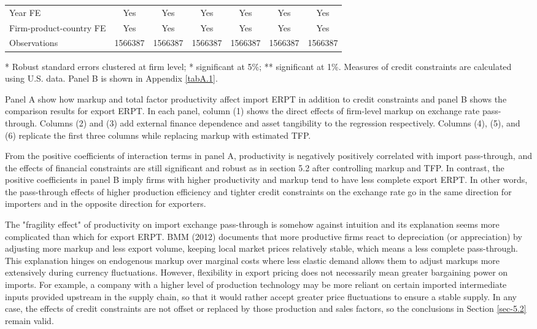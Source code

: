 \begin{table}[htbp]
\begin{threeparttable}
\begin{tabular}{lcccccc}
		Year FE  & Yes   & Yes   & Yes   & Yes   & Yes   & Yes \\
		Firm-product-country FE & Yes   & Yes   & Yes   & Yes   & Yes   & Yes \\
		Observations & 1566387 & 1566387 & 1566387 & 1566387 & 1566387 & 1566387 \\
		\bottomrule
	\end{tabular}
	\begin{tablenotes}
		\footnotesize
		\item[*] Robust standard errors clustered at firm level; * significant at 5\%; ** significant at 1\%. Measures of credit constraints are calculated using U.S. data. Panel B is shown in Appendix \ref{tabA.1}.
	\end{tablenotes}
	\end{threeparttable}
	\label{tab5.3}
\end{table}

Panel A show how markup and total factor productivity affect import ERPT in addition to credit constraints and panel B shows the comparison results for export ERPT. In each panel, column (1) shows the direct effects of firm-level markup on exchange rate pass-through. Columns (2) and (3) add external finance dependence and asset tangibility to the regression respectively. Columns (4), (5), and (6) replicate the first three columns while replacing markup with estimated TFP. 

From the positive coefficients of interaction terms in panel A, productivity is negatively positively correlated with import pass-through, and the effects of financial constraints are still significant and robust as in section 5.2 after controlling markup and TFP. In contrast, the positive coefficients in panel B imply firms with higher productivity and markup tend to have less complete export ERPT. In other words, the pass-through effects of higher production efficiency and tighter credit constraints on the exchange rate go in the same direction for importers and in the opposite direction for exporters. 

The "fragility effect" of productivity on import exchange pass-through is somehow against intuition and its explanation seems more complicated than which for export ERPT. BMM (2012)\cite{bmm2012} documents that more productive firms react to depreciation (or appreciation) by adjusting more markup and less export volume, keeping local market prices relatively stable, which means a less complete pass-through. This explanation hinges on endogenous markup over marginal costs where less elastic demand allows them to adjust markups more extensively during currency fluctuations. However, flexibility in export pricing does not necessarily mean greater bargaining power on imports. For example, a company with a higher level of production technology may be more reliant on certain imported intermediate inputs provided upstream in the supply chain, so that it would rather accept greater price fluctuations to ensure a stable supply. In any case, the effects of credit constraints are not offset or replaced by those production and sales factors, so the conclusions in Section \ref{sec-5.2} remain valid.

